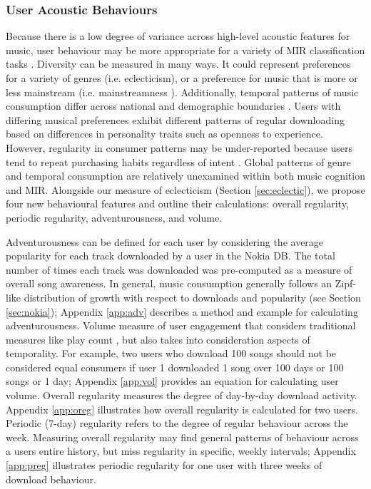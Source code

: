 \documentclass[a4paper]{article}
\begin{document}
\subsubsection{User Acoustic Behaviours}
Because there is a low degree of variance across high-level acoustic features for music, user behaviour may be more appropriate for a variety of MIR classification tasks \cite{vigliensoni2016automatic}. Diversity can be measured in many ways. It could represent preferences for a variety of genres (i.e. eclecticism), or a preference for music that is more or less mainstream (i.e. mainstreamness \cite{vigliensoni2016automatic}). Additionally, temporal patterns of music consumption differ across national and demographic boundaries \cite{molteni2003consumption,woolhouse2013work}. Users with differing musical preferences exhibit different patterns of regular downloading based on differences in personality traits such as openness to experience\cite{rentfrow2003re}. However, regularity in consumer patterns may be under-reported because users tend to repeat purchasing habits regardless of intent \cite{ji2007purchase}. Global patterns of genre and temporal consumption are relatively unexamined within both music cognition and MIR. Alongside our measure of eclecticism (Section \ref{sec:eclectic}), we propose four new behavioural features and outline their calculations: overall regularity, periodic regularity, adventurousness, and volume.

Adventurousness can be defined for each user by considering the average popularity for each track downloaded by a user in the Nokia DB. The total number of times each track was downloaded was pre-computed as a measure of overall song awareness. In general, music consumption generally follows an Zipf-like distribution of growth with respect to downloads and popularity (see Section \ref{sec:nokia}); Appendix \ref{app:adv} describes a method and example for calculating adventurousness. Volume measure of user engagement that considers traditional measures like play count \cite{Chen2001}, but also takes into consideration aspects of temporality. For example, two users who download 100 songs should not be considered equal consumers if user 1 downloaded 1 song over 100 days or 100 songs or 1 day; Appendix \ref{app:vol} provides an equation for calculating user volume. Overall regularity measures the degree of day-by-day download activity. Appendix \ref{app:oreg} illustrates how overall regularity is calculated for two users. Periodic (7-day) regularity refers to the degree of regular behaviour across the week. Measuring overall regularity may find general patterns of behaviour across a users entire history, but miss regularity in specific, weekly intervals; Appendix \ref{app:preg} illustrates periodic regularity for one user with three weeks of download behaviour. 
\end{document}
